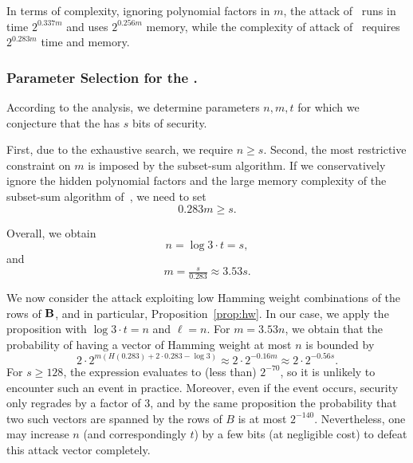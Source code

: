 In terms of complexity, ignoring polynomial factors in $m$,
the attack of~\cite{Howgrave-GrahamJ10} runs in time $2^{0.337m}$ and uses $2^{0.256m}$ memory,
while the complexity of attack of~\cite{BonnetainBSS20} requires $2^{0.283m}$ time and memory.






\subsubsection{Parameter Selection for the \ttOWF.}
According to the analysis, we determine parameters $n,m,t$ for which
we conjecture that the \ttOWF has $s$ bits of security.

First, due to the exhaustive search, we require $n \geq s$.
Second,
the most restrictive constraint on $m$ is imposed by the subset-sum algorithm.
If we conservatively ignore the hidden polynomial factors and the large memory
complexity of the subset-sum algorithm of~\cite{BonnetainBSS20}, we need to set
$$0.283m \geq s.$$

Overall, we obtain
$$n = \log 3 \cdot t = s,$$
and $$m = \tfrac{s}{0.283} \approx 3.53 s.$$

We now consider the attack exploiting low Hamming weight combinations of the rows of $\mat{B}$,
and in particular, Proposition~\ref{prop:hw}.
In our case, we apply the proposition with $\log 3 \cdot t = n$ and $\ell = n$.
For $m = 3.53 n$, we obtain that the probability of having a vector of Hamming weight at most $n$ is bounded by
$$2 \cdot 2^{m (H(0.283) + 2 \cdot 0.283 - \log 3)} \approx 2 \cdot 2^{-0.16m} \approx 2 \cdot 2^{- 0.56 s}.$$
For $s \geq 128$, the expression evaluates to (less than) $2^{-70}$, so it is unlikely to encounter such an event in practice.
Moreover, even if the event occurs, security only regrades by a factor of 3, and by the same
proposition the probability that two such vectors are spanned by the rows of $B$ is at most $2^{-140}$.
Nevertheless, one may increase $n$ (and correspondingly $t$)
by a few bits (at negligible cost) to defeat this attack vector completely.

